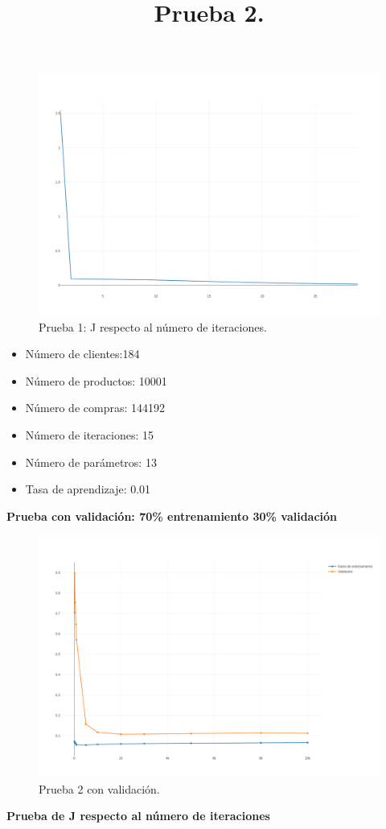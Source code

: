 {{{{\FloatBarrier
\begin{figure}[htbp!]
		\centering
			\includegraphics[width=1 \textwidth]{imagenes/pruebassistemarecom/1_j}
		\caption{Prueba 1: J respecto al número de iteraciones.}
\end{figure}
\FloatBarrier

\title{\textbf{Prueba 2.}}

\begin{itemize}
\item Número de clientes:184
\item Número de productos: 10001
\item Número de compras: 144192
\item Número de iteraciones: 15
\item Número de parámetros: 13
\item Tasa de aprendizaje: 0.01
\end{itemize}
\newpage
\textbf{Prueba con validación: 70\% entrenamiento 30\% validación}

\FloatBarrier
\begin{figure}[htbp!]
		\centering
			\includegraphics[width=1 \textwidth]{imagenes/pruebassistemarecom/15_0_13}
		\caption{Prueba 2 con validación.}
\end{figure}
\FloatBarrier
\newpage
\textbf{Prueba de J respecto al número de iteraciones}

}}}}
